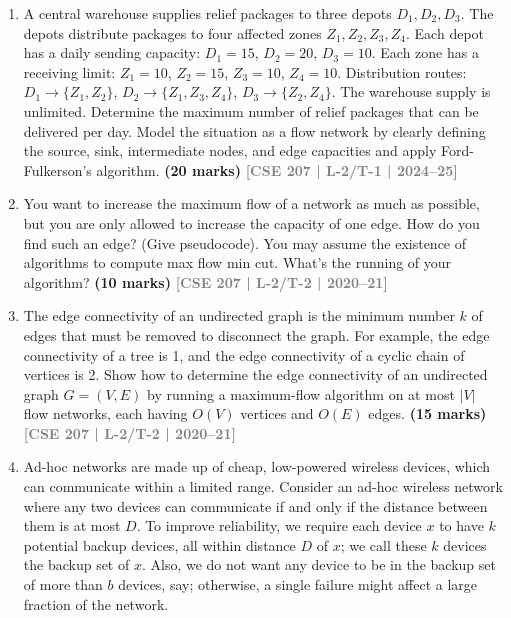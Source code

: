 \documentclass[12pt]{article}
\newcommand{\yr}[1]{\hfill\textcolor{gray}{\small\textbf{[#1]}}}
\newcommand{\mk}[1]{\textcolor{orange!70!black}{\small\textbf{(#1 marks)}}}
\begin{document}
\begin{enumerate}

  \item A central warehouse supplies relief packages to three depots $D_1, D_2, D_3$. The depots distribute packages to four affected zones $Z_1, Z_2, Z_3, Z_4$. Each depot has a daily sending capacity: $D_1 = 15$, $D_2 = 20$, $D_3 = 10$. Each zone has a receiving limit: $Z_1 = 10$, $Z_2 = 15$, $Z_3 = 10$, $Z_4 = 10$. Distribution routes: $D_1 \to \{Z_1, Z_2\}$, $D_2 \to \{Z_1, Z_3, Z_4\}$, $D_3 \to \{Z_2, Z_4\}$. The warehouse supply is unlimited. Determine the maximum number of relief packages that can be delivered per day. Model the situation as a flow network by clearly defining the source, sink, intermediate nodes, and edge capacities and apply Ford-Fulkerson's algorithm.
    \mk{20} \yr{CSE 207 | L-2/T-1 | 2024--25}


  \item You want to increase the maximum flow of a network as much as possible, but you are only allowed to increase the capacity of one edge. How do you find such an edge? (Give pseudocode). You may assume the existence of algorithms to compute max flow min cut. What's the running of your algorithm?
    \mk{10} \yr{CSE 207 | L-2/T-2 | 2020--21}


  \item The edge connectivity of an undirected graph is the minimum number $k$ of edges that must be removed to disconnect the graph. For example, the edge connectivity of a tree is 1, and the edge connectivity of a cyclic chain of vertices is 2. Show how to determine the edge connectivity of an undirected graph $G = (V, E)$ by running a maximum-flow algorithm on at most $|V|$ flow networks, each having $O(V)$ vertices and $O(E)$ edges.
    \mk{15} \yr{CSE 207 | L-2/T-2 | 2020--21}


  \item Ad-hoc networks are made up of cheap, low-powered wireless devices, which can communicate within a limited range. Consider an ad-hoc wireless network where any two devices can communicate if and only if the distance between them is at most $D$. To improve reliability, we require each device $x$ to have $k$ potential backup devices, all within distance $D$ of $x$; we call these $k$ devices the backup set of $x$. Also, we do not want any device to be in the backup set of more than $b$ devices, say; otherwise, a single failure might affect a large fraction of the network.


\end{enumerate}
\end{document}
